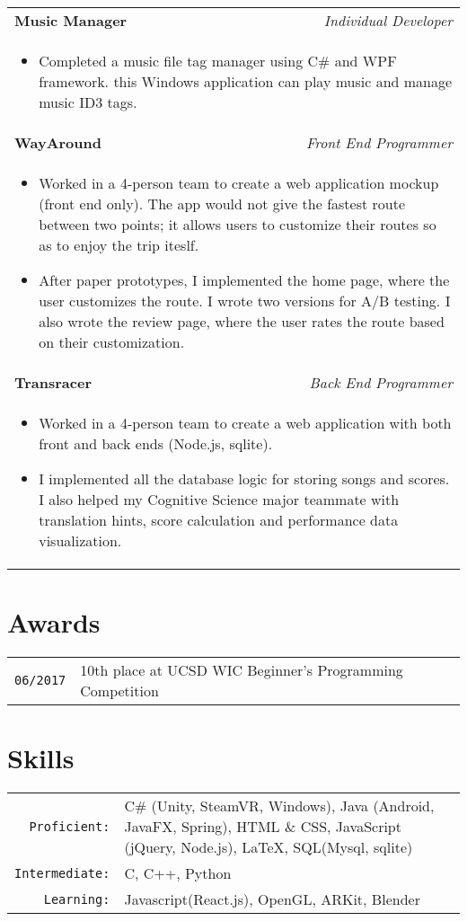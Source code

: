 \documentclass[10pt, letterpaper]{article}
\begin{document}
\begin{tabular}{l r}
\textbf{\large Music Manager} & \textit{Individual Developer} \\
\multicolumn{2}{p{\linewidth}}{
\begin{itemize}
	\item Completed a music file tag manager using C\# and WPF framework. this Windows application can play music and manage music ID3 tags.
\end{itemize}
} \\

\textbf{\large WayAround} & \textit{Front End Programmer} \\
\multicolumn{2}{p{\linewidth}}{
\begin{itemize}
	\item Worked in a 4-person team to create a web application mockup (front end only). The app would not give the fastest route between two points; it allows users to customize their routes so as to enjoy the trip iteslf.
	\item After paper prototypes, I implemented the home page, where the user customizes the route. I wrote two versions for A/B testing. I also wrote the review page, where the user rates the route based on their customization.
\end{itemize}	
} \\

\textbf{\large Transracer} & \textit{Back End Programmer} \\
\multicolumn{2}{p{\linewidth}}{
\begin{itemize}
	\item Worked in a 4-person team to create a web application with both front and back ends (Node.js, sqlite).
	\item I implemented all the database logic for storing songs and scores. I also helped my Cognitive Science major teammate with translation hints, score calculation and performance data visualization.
\end{itemize}
}
\end{tabular}


\section{Awards}
\smallskip
\noindent
\begin{tabularx}{\linewidth}{r | X}
	\texttt{06/2017} & 10th place at UCSD WIC Beginner's Programming Competition
\end{tabularx}


\section{Skills}
\smallskip
\noindent
\begin{tabularx}{\linewidth}{r X}
	\texttt{Proficient:} & C\# (Unity, SteamVR, Windows), Java (Android, JavaFX, Spring), HTML \& CSS, JavaScript (jQuery, Node.js), \LaTeX, SQL(Mysql, sqlite) \\
	\texttt{Intermediate:} & C, C++, Python \\
	\texttt{Learning:} & Javascript(React.js), OpenGL, ARKit, Blender
\end{tabularx}
\end{document}
